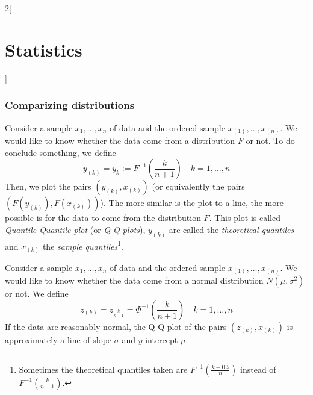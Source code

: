 \documentclass[../../../main.tex]{subfiles}
\begin{document}
\begin{multicols}{2}[\section{Statistics}]
  \subsubsection{Comparizing distributions}
  \begin{definition}[Q-Q plots]
    Consider a sample $x_1,\ldots,x_n$ of data and the ordered sample $x_{(1)},\ldots,x_{(n)}$. We would like to know whether the data come from a distribution $F$ or not. To do conclude something, we define $$y_{(k)}=y_k:=F^{-1}\left(\frac{k}{n+1}\right)\quad k=1,\ldots,n$$
    Then, we plot the pairs $(y_{(k)},x_{(k)})$ (or equivalently the pairs $(F(y_{(k)}),F(x_{(k)}))$). The more similar is the plot to a line, the more possible is for the data to come from the distribution $F$. This plot is called \emph{Quantile-Quantile plot} (or \emph{Q-Q plots}), $y_{(k)}$ are called the \emph{theoretical quantiles} and $x_{(k)}$ the \emph{sample quantiles}\footnote{Sometimes the theoretical quantiles taken are $F^{-1}\left(\frac{k-0.5}{n}\right)$ instead of $F^{-1}\left(\frac{k}{n+1}\right)$.}.
  \end{definition}
  \begin{proposition}
    Consider a sample $x_1,\ldots,x_n$ of data and the ordered sample $x_{(1)},\ldots,x_{(n)}$. We would like to know whether the data come from a normal distribution $N(\mu,\sigma^2)$ or not. We define $$z_{(k)}=z_{\frac{k}{n+1}}=\Phi^{-1}\left(\frac{k}{n+1}\right)\quad k=1,\ldots,n$$
    If the data are reasonably normal, the Q-Q plot of the pairs $(z_{(k)},x_{(k)})$ is approximately a line of slope $\sigma$ and $y$-intercept $\mu$.
  \end{proposition}
  \begin{center}
    \begin{minipage}{\linewidth}
      \centering
      
    \end{minipage}
  \end{center}
\end{multicols}
\end{document}
